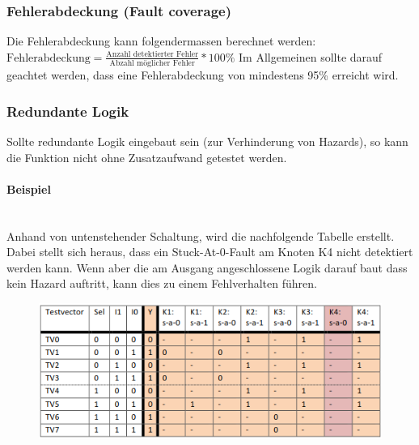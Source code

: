 \subsubsection{Fehlerabdeckung (Fault coverage)}
Die Fehlerabdeckung kann folgendermassen berechnet werden: $\text{Fehlerabdeckung}=\frac{\text{Anzahl detektierter Fehler}}{\text{Abzahl möglicher Fehler}}*100\%$ Im Allgemeinen sollte darauf geachtet werden, dass eine Fehlerabdeckung von mindestens 95\% erreicht wird.

\subsubsection{Redundante Logik}
Sollte redundante Logik eingebaut sein (zur Verhinderung von Hazards), so kann die Funktion nicht ohne Zusatzaufwand getestet werden.
\paragraph{Beispiel}$~$ \\
Anhand von untenstehender Schaltung, wird die nachfolgende Tabelle erstellt. Dabei stellt sich heraus, dass ein Stuck-At-0-Fault am Knoten K4 nicht detektiert werden kann. Wenn aber die am Ausgang angeschlossene Logik darauf baut dass kein Hazard auftritt, kann dies zu einem Fehlverhalten führen.\\
\begin{minipage}{0.6\textwidth}
\begin{figure}[H]
    \includegraphics[width=1.0\textwidth]{images/stuckat_redundant_1.png}
\end{figure}
\end{minipage}
\hfill
